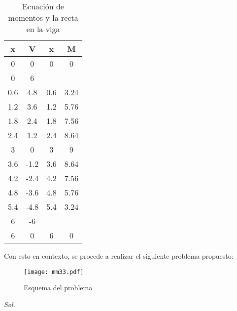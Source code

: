 \begin{table}[h!]
    \centering
    \begin{tabular}{@{}cccc@{}}
    \toprule
    x   & V    & x                    & M                    \\ \midrule
    0   & 0    & 0                    & 0                    \\
    0   & 6    &                      &                      \\
    0.6 & 4.8  & 0.6                  & 3.24                 \\
    1.2 & 3.6  & 1.2                  & 5.76                 \\
    1.8 & 2.4  & 1.8                  & 7.56                 \\
    2.4 & 1.2  & 2.4                  & 8.64                 \\
    3   & 0    & 3                    & 9                    \\
    3.6 & -1.2 & 3.6                  & 8.64                 \\
    4.2 & -2.4 & 4.2                  & 7.56                 \\
    4.8 & -3.6 & 4.8                  & 5.76                 \\
    5.4 & -4.8 & 5.4                  & 3.24                 \\
    6   & -6   & \multicolumn{1}{l}{} & \multicolumn{1}{l}{} \\
    6   & 0    & 6                    & 0                    \\ \bottomrule
    \end{tabular}
    \caption{Ecuación de momentos y la recta en la viga}
    \label{tabmm888}
\end{table}
Con esto en contexto, se procede a realizar el siguiente problema propuesto:
\begin{problem}
    \begin{figure}[h!]
    \centering
      \texttt{[image: mm33.pdf]}
      \caption{Esquema del problema}
      \label{mm33}
    \end{figure}
\end{problem}

\textit{ Sol. }

